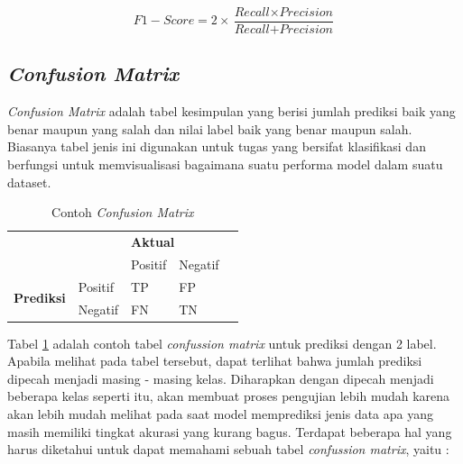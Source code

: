 \begin{equation}
    \label{form: f1-score}
    F1-Score = 2 \times \frac{\textit{Recall} \times \textit{Precision}}{\textit{Recall} + \textit{Precision}}
\end{equation}

\subsection{\textit{Confusion Matrix}}

\textit{Confusion Matrix} adalah tabel kesimpulan yang berisi jumlah prediksi baik yang benar maupun yang 
salah dan nilai label baik yang benar maupun salah. Biasanya tabel jenis ini digunakan untuk tugas yang 
bersifat klasifikasi dan berfungsi untuk memvisualisasi bagaimana suatu performa model dalam suatu dataset.

\begin{table}
    \caption{Contoh \textit{Confusion Matrix}}
    \label{tab:cth_confusion_mtrx}
    \centering
    \begin{tabular}{|l|l|l|l|l}
        \cline{1-4}
        \multicolumn{2}{|l|}{\multirow{2}{*}{}} & \multicolumn{2}{l|}{\textbf{Aktual}} &                \\ \cline{3-4}
        \multicolumn{2}{|l|}{}                  & Positif                              & Negatif &      \\ \cline{1-4}
        \multirow{2}{*}{\textbf{Prediksi}}      & Positif                              & TP      & FP & \\ \cline{2-4}
                                                & Negatif                              & FN      & TN & \\ \cline{1-4}
    \end{tabular}
\end{table}

Tabel \ref{tab:cth_confusion_mtrx} adalah contoh tabel \textit{confussion matrix} untuk prediksi dengan 2 label. 
Apabila melihat pada tabel tersebut, dapat terlihat bahwa jumlah prediksi dipecah menjadi masing - masing kelas. 
Diharapkan dengan dipecah menjadi beberapa kelas seperti itu, akan membuat proses pengujian lebih mudah karena 
akan lebih mudah melihat pada saat model memprediksi jenis data apa yang masih memiliki tingkat akurasi yang 
kurang bagus. Terdapat beberapa hal yang harus diketahui untuk dapat memahami sebuah tabel \textit{confussion 
matrix}, yaitu :


